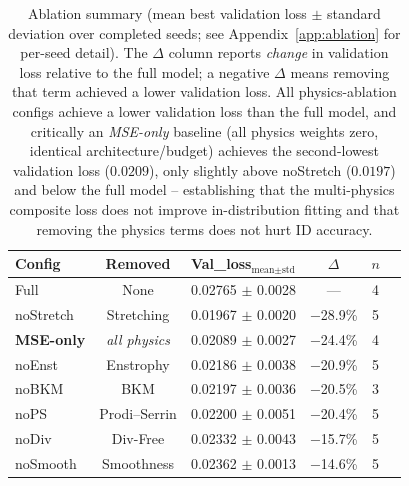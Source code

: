 \documentclass[review]{elsarticle}
\begin{document}
\begin{table}[t]
\centering
\caption{Ablation summary (mean best validation loss $\pm$ standard deviation over completed seeds; see Appendix~\ref{app:ablation} for per-seed detail). The $\Delta$ column reports \emph{change} in validation loss relative to the full model; a negative $\Delta$ means removing that term achieved a lower validation loss. All physics-ablation configs achieve a lower validation loss than the full model, and critically an \emph{MSE-only} baseline (all physics weights zero, identical architecture/budget) achieves the second-lowest validation loss ($0.0209$), only slightly above noStretch ($0.0197$) and below the full model -- establishing that the multi-physics composite loss does not improve in-distribution fitting and that removing the physics terms does not hurt ID accuracy.}
\label{tab:ablation}
\begin{tabular}{lccccc}
\toprule
Config & Removed & Val\_loss$_{\text{mean}\pm\text{std}}$ & $\Delta$ & $n$ \\
\midrule
Full & None & 0.02765 $\pm$ 0.0028 & --- & 4 \\
noStretch & Stretching & 0.01967 $\pm$ 0.0020 & $-$28.9\% & 5 \\
\textbf{MSE-only} & \emph{all physics} & 0.02089 $\pm$ 0.0027 & $-$24.4\% & 4 \\
noEnst & Enstrophy & 0.02186 $\pm$ 0.0038 & $-$20.9\% & 5 \\
noBKM & BKM & 0.02197 $\pm$ 0.0036 & $-$20.5\% & 3 \\
noPS & Prodi--Serrin & 0.02200 $\pm$ 0.0051 & $-$20.4\% & 5 \\
noDiv & Div-Free & 0.02332 $\pm$ 0.0043 & $-$15.7\% & 5 \\
noSmooth & Smoothness & 0.02362 $\pm$ 0.0013 & $-$14.6\% & 5 \\
\bottomrule
\end{tabular}
\end{table}
\end{document}
